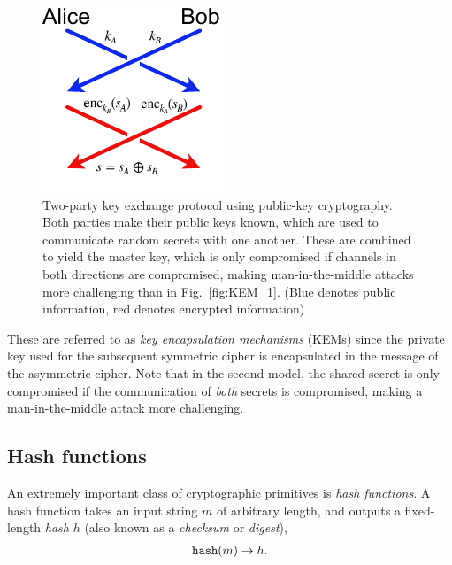 \begin{figure}[!htb]
	\centering
	\includegraphics[width=0.75\columnwidth]{figures/Key_exchange_two_ways}
	\caption{Two-party key exchange protocol using public-key cryptography. Both parties make their public keys known, which are used to communicate random secrets with one another. These are combined to yield the master key, which is only compromised if channels in both directions are compromised, making man-in-the-middle attacks more challenging than in Fig.~\ref{fig:KEM_1}. (Blue denotes public information, red denotes encrypted information)} \label{fig:KEM_2}
\end{figure}

These are referred to as \emph{key encapsulation mechanisms} (KEMs) since the private key used for the subsequent symmetric cipher is encapsulated in the message of the asymmetric cipher. Note that in the second model, the shared secret is only compromised if the communication of \emph{both} secrets is compromised, making a man-in-the-middle attack more challenging.

\subsection{Hash functions} \label{hash-functions}

An extremely important class of cryptographic primitives is \emph{hash functions}. A hash function takes an input string $m$ of arbitrary length, and outputs a fixed-length \emph{hash} $h$ (also known as a \emph{checksum} or \emph{digest}),
\begin{align}
	{\tt hash}(m)\to h.
\end{align}


